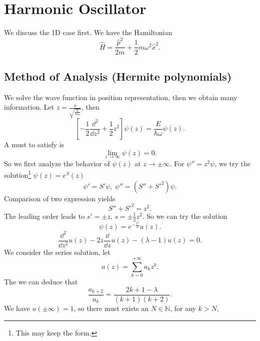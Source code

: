 \documentclass{article}
\theoremstyle{1}
\begin{document}
\section{Harmonic Oscillator}

We discuss the 1D case first. We have the Hamiltonian
\begin{equation}
    \hat{H}=\frac{\hat{p}^2}{2m}+\frac{1}{2}m\omega^2\hat{x}^2.
\end{equation}
\subsection{Method of Analysis (Hermite polynomials)}
We solve the wave function in position representation, then we obtain many information. Let $z=\frac{x}{\sqrt{\frac{\hbar}{m\omega}}}$, then 
\begin{equation}
    \left[-\frac{1}{2}\frac{\dd^2}{\dd{z}^2}+\frac{1}{2}z^2\right]\psi(z)=\frac{E}{\hbar \omega}\psi(z).
\end{equation}
A must to satisfy is 
\begin{equation}
    \lim_{z\rightarrow \infty}\psi(z)=0.   
\end{equation}
So we first analyze the behavior of $\psi(z)$ at $z\rightarrow \pm\infty$. For $\psi''=z^2\psi$, we try the solution\footnote{This may keep the form.} $\psi(z)=e^S(z)$
\begin{equation}
    \psi'=S'\psi,\ \psi''=\left(S''+S'^2\right)\psi.
\end{equation}
Comparison of two expression yields
\begin{equation}
    S''+S'^2=z^2.
\end{equation}
The leading order leads to $s'=\pm z$, $s=\pm\frac{1}{2}z^2$. So we can try the solution 
\begin{equation}
    \psi(z)=e^{-\frac{z^2}{2}} u(z).
\end{equation}
\begin{equation}\label{9.6}
    \frac{\dd^2}{\dd{z}^2}u(z)-2z\frac{\dd}{\dd{z}}u(z)-\left(\lambda-1\right)u(z)=0.
\end{equation}
We consider the series solution, let
\begin{equation}
    u(z)=\sum_{k=0}^{+\infty}a_kz^k.
\end{equation}
The we can deduce that 
\begin{equation}
    \frac{a_{k+2}}{a_k}=\frac{2k+1-\lambda}{(k+1)(k+2)}.
\end{equation}
We have $u(\pm\infty)=1$, so there must exists an $N\in \mathbb{N}$, for any $k>N$, 
\end{document}
